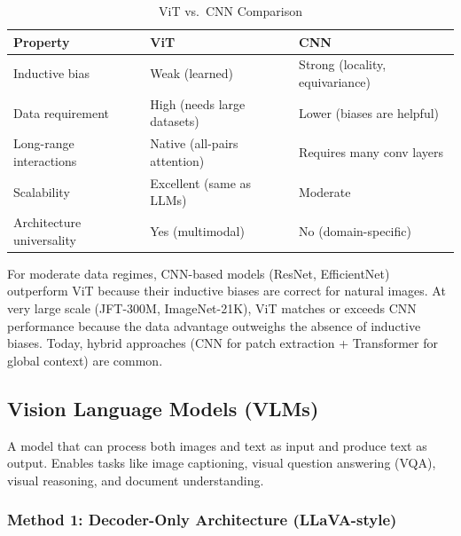 \documentclass[11pt, a4paper]{article}
\begin{document}
\begin{table}[h]
\centering
\caption{ViT vs.\ CNN Comparison}
\begin{tabular}{@{}lll@{}}
\toprule
\textbf{Property} & \textbf{ViT} & \textbf{CNN} \\
\midrule
Inductive bias & Weak (learned) & Strong (locality, equivariance) \\
Data requirement & High (needs large datasets) & Lower (biases are helpful) \\
Long-range interactions & Native (all-pairs attention) & Requires many conv layers \\
Scalability & Excellent (same as LLMs) & Moderate \\
Architecture universality & Yes (multimodal) & No (domain-specific) \\
\bottomrule
\end{tabular}
\end{table}

\begin{notebox}
For moderate data regimes, CNN-based models (ResNet, EfficientNet) outperform ViT because their inductive biases are correct for natural images. At very large scale (JFT-300M, ImageNet-21K), ViT matches or exceeds CNN performance because the data advantage outweighs the absence of inductive biases. Today, hybrid approaches (CNN for patch extraction + Transformer for global context) are common.
\end{notebox}

\subsection{Vision Language Models (VLMs)}

\begin{defbox}
A model that can process both images and text as input and produce text as output. Enables tasks like image captioning, visual question answering (VQA), visual reasoning, and document understanding.
\end{defbox}

\subsubsection{Method 1: Decoder-Only Architecture (LLaVA-style)}
\end{document}
